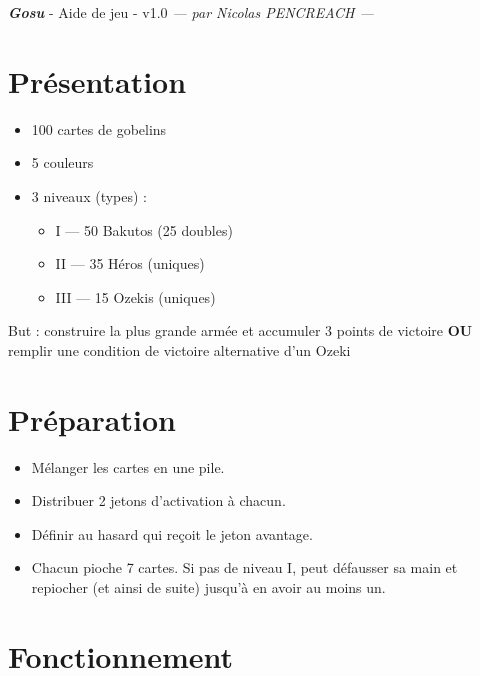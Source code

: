 \documentclass[10pt, a4paper]{article}	%
\begin{document}
{\LARGE \textbf{\textit{Gosu}}}
{\large - Aide de jeu - v1.0}\textit{ — par Nicolas PENCREACH —}

\setlength{\columnseprule}{0.002cm}	%
\begin{multicols}{3}				%

\section{Présentation}
\label{sec:presentation}

\begin{itemize}
\item 100 cartes de gobelins
\item 5 couleurs
\item 3 niveaux (types) :
	\begin{itemize}
	\item I   — 50 Bakutos (25 doubles)
	\item II  — 35 Héros (uniques)
	\item III — 15 Ozekis (uniques)
	\end{itemize}
\end{itemize}

But : construire la plus grande armée et accumuler 3 points de victoire \textbf{OU} remplir une condition de victoire alternative d’un Ozeki


\section{Préparation}
\label{sec:preparation}

\begin{itemize}
\item Mélanger les cartes en une pile.
\item Distribuer 2 jetons d’activation à chacun.
\item Définir au hasard qui reçoit le jeton avantage.
\item Chacun pioche 7 cartes. Si pas de niveau I, peut défausser sa main et repiocher (et ainsi de suite) jusqu’à en avoir au moins un.
\end{itemize}


\section{Fonctionnement}
\label{sec:fonctionnement}


\end{multicols}
\end{document}

